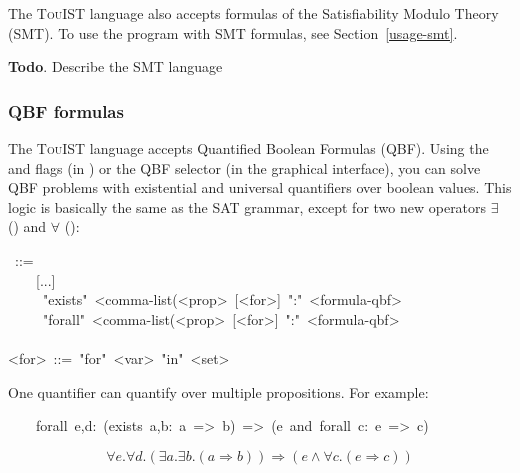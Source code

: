 \noindent The {\scshape TouIST} language also accepts formulas of the Satisfiability Modulo Theory (SMT).
To use the  program with SMT formulas, see Section~\ref{usage-smt}.%

\noindent\textbf{Todo}.
Describe the SMT language%

\subsubsection{QBF formulas}\label{sec-qbf-formulas}%

\noindent The {\scshape TouIST} language accepts Quantified Boolean Formulas (QBF). Using
the  and  flags (in ) or the QBF selector (in the
graphical interface), you can solve QBF problems with existential and
universal quantifiers over boolean values. This logic is basically the
same as the SAT grammar, except for two new operators $\exists$
() and $\forall$ ():%
\begin{mdpre}%
~::=\\
~~~~{}[...]\\
~~~~\textbar{}~"exists"~{\textless{}comma-list(\textless{}prop\textgreater{}}~{}[{\textless{}for\textgreater{}}]~":"~{\textless{}formula-qbf\textgreater{}}\\
~~~~\textbar{}~"forall"~{\textless{}comma-list(\textless{}prop\textgreater{}}~{}[{\textless{}for\textgreater{}}]~":"~{\textless{}formula-qbf\textgreater{}}\\
\\
{\textless{}for\textgreater{}}~::=~"for"~{\textless{}var\textgreater{}}~"in"~{\textless{}set\textgreater{}}%
\end{mdpre}\noindent One quantifier can quantify over multiple propositions. For example:
\begin{mdpre}%
\noindent~~~~{forall}~e,d:~({exists}~a,b:~a~=\textgreater{}~b)~=\textgreater{}~(e~and~{forall}~c:~e~=\textgreater{}~c)%
\end{mdpre}\noindent\noindent\[\forall e. \forall d. (\exists a. \exists b. (a \Rightarrow b)) \Rightarrow (e \wedge \forall c. (e \Rightarrow c))
\]%

